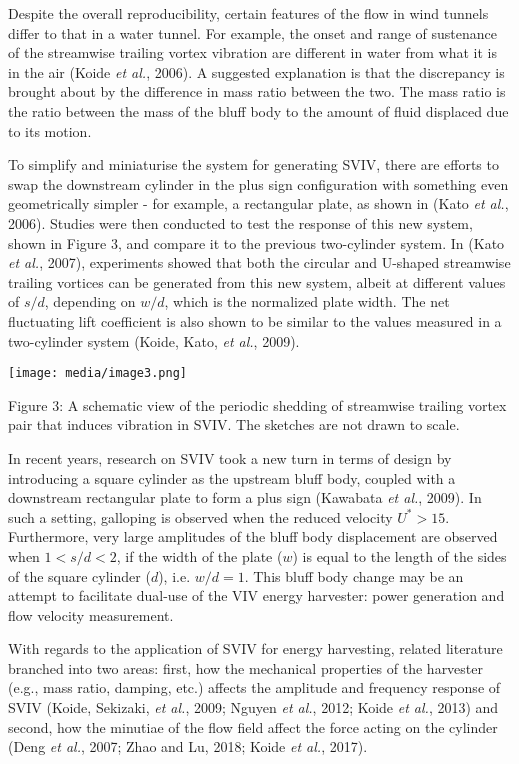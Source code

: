 \documentclass[]{article}
\begin{document}
Despite the overall reproducibility, certain features of the flow in
wind tunnels differ to that in a water tunnel. For example, the onset
and range of sustenance of the streamwise trailing vortex vibration are
different in water from what it is in the air (Koide \emph{et al.},
2006). A suggested explanation is that the discrepancy is brought about
by the difference in mass ratio between the two. The mass ratio is the
ratio between the mass of the bluff body to the amount of fluid
displaced due to its motion.

To simplify and miniaturise the system for generating SVIV, there are
efforts to swap the downstream cylinder in the plus sign configuration
with something even geometrically simpler - for example, a rectangular
plate, as shown in (Kato \emph{et al.}, 2006). Studies were then
conducted to test the response of this new system, shown in Figure 3,
and compare it to the previous two-cylinder system. In (Kato \emph{et
al.}, 2007), experiments showed that both the circular and U-shaped
streamwise trailing vortices can be generated from this new system,
albeit at different values of \(s/d\), depending on \(w/d\), which is
the normalized plate width. The net fluctuating lift coefficient is also
shown to be similar to the values measured in a two-cylinder system
(Koide, Kato, \emph{et al.}, 2009).

\texttt{[image: media/image3.png]}

\protect\hypertarget{_Ref40994137}{}{\protect\hypertarget{_Toc520544687}{}{\protect\hypertarget{_Toc41048826}{}{}}}Figure
3: A schematic view of the periodic shedding of streamwise trailing
vortex pair that induces vibration in SVIV. The sketches are not drawn
to scale.

In recent years, research on SVIV took a new turn in terms of design by
introducing a square cylinder as the upstream bluff body, coupled with a
downstream rectangular plate to form a plus sign (Kawabata \emph{et
al.}, 2009). In such a setting, galloping is observed when the reduced
velocity \(U^{*} > 15\). Furthermore, very large amplitudes of the bluff
body displacement are observed when \(1 < s/d < 2\), if the width of the
plate (\(w\)) is equal to the length of the sides of the square cylinder
(\(d\)), i.e. \(w/d = 1\). This bluff body change may be an attempt to
facilitate dual-use of the VIV energy harvester: power generation and
flow velocity measurement.

With regards to the application of SVIV for energy harvesting, related
literature branched into two areas: first, how the mechanical properties
of the harvester (e.g., mass ratio, damping, etc.) affects the amplitude
and frequency response of SVIV (Koide, Sekizaki, \emph{et al.}, 2009;
Nguyen \emph{et al.}, 2012; Koide \emph{et al.}, 2013) and second, how
the minutiae of the flow field affect the force acting on the cylinder
(Deng \emph{et al.}, 2007; Zhao and Lu, 2018; Koide \emph{et al.},
2017).
\end{document}
